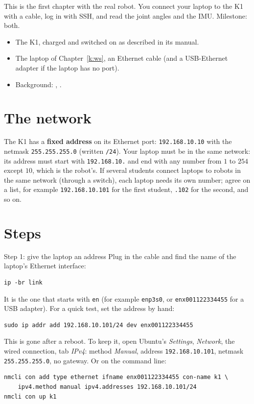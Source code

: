 \label{k:box}

This is the first chapter with the real robot. You connect your laptop to the K1 with a cable, log in with SSH, and read the joint angles and the IMU. Milestone: both.

\begin{needbox}
\begin{itemize}[nosep]
  \item The K1, charged and switched on as described in its manual.
  \item The laptop of Chapter~\ref{k:ws}, an Ethernet cable (and a USB-Ethernet adapter if the laptop has no port).
  \item Background: , .
\end{itemize}
\end{needbox}

\section*{The network}
The K1 has a \textbf{fixed address} on its Ethernet port: \texttt{192.168.10.10} with the netmask \texttt{255.255.255.0} (written \texttt{/24}). Your laptop must be in the same network: its address must start with \texttt{192.168.10.} and end with any number from $1$ to $254$ except $10$, which is the robot's. If several students connect laptops to robots in the same network (through a switch), each laptop needs its own number; agree on a list, for example \texttt{192.168.10.101} for the first student, \texttt{.102} for the second, and so on.

\section*{Steps}
\begin{stepbox}{Step 1: give the laptop an address}
Plug in the cable and find the name of the laptop's Ethernet interface:
\begin{verbatim}
ip -br link
\end{verbatim}
It is the one that starts with \texttt{en} (for example \texttt{enp3s0}, or \texttt{enx001122334455} for a USB adapter). For a quick test, set the address by hand:
\begin{verbatim}
sudo ip addr add 192.168.10.101/24 dev enx001122334455
\end{verbatim}
This is gone after a reboot. To keep it, open Ubuntu's \emph{Settings}, \emph{Network}, the wired connection, tab \emph{IPv4}: method \emph{Manual}, address \texttt{192.168.10.101}, netmask \texttt{255.255.255.0}, no gateway. Or on the command line:
\begin{verbatim}
nmcli con add type ethernet ifname enx001122334455 con-name k1 \
    ipv4.method manual ipv4.addresses 192.168.10.101/24
nmcli con up k1
\end{verbatim}
\end{stepbox}

